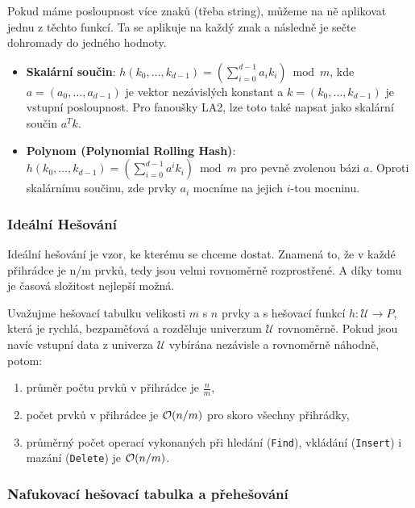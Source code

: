 \bigskip

\noindent Pokud máme posloupnost více znaků (třeba string), můžeme na ně aplikovat jednu z těchto funkcí. Ta se aplikuje na každý znak a následně je sečte dohromady do jedného hodnoty.

\begin{itemize}
    \item \textbf{Skalární součin}: $h(k_0, \dots, k_{d-1}) = \left( \sum_{i=0}^{d-1} a_i k_i \right) \bmod m$, kde $a = (a_0, \dots, a_{d-1})$ je vektor nezávislých konstant a $k =(k_0, \dots, k_{d-1})$ je vstupní posloupnost. Pro fanoušky LA2, lze toto také napsat jako skalární součin $a^Tk$.
    \item \textbf{Polynom (Polynomial Rolling Hash)}: $h(k_0, \dots, k_{d-1}) = \left( \sum_{i=0}^{d-1} a^i k_i \right) \bmod m$ pro pevně zvolenou bázi $a$. Oproti skalárnímu součinu, zde prvky $a_i$ mocníme na jejich $i$-tou mocninu.
\end{itemize}

\bigskip

\subsubsection{Ideální Hešování}

Ideální hešování je vzor, ke kterému se chceme dostat. Znamená to, že v každé přihrádce je n/m prvků, tedy jsou velmi rovnoměrně rozprostřené. A díky tomu je časová složitost nejlepší možná.

\begin{definition}
Uvažujme hešovací tabulku velikosti $m$ s $n$ prvky a s hešovací funkcí $h: \mathcal{U} \to P$, která je rychlá, bezpaměťová a rozděluje univerzum $\mathcal{U}$ rovnoměrně. Pokud jsou navíc vstupní data z univerza $\mathcal{U}$ vybírána nezávisle a rovnoměrně náhodně, potom: \begin{enumerate}[itemsep=-0.2em]
    \item průměr počtu prvků v přihrádce je $\frac{n}{m}$,
    \item počet prvků v přihrádce je $\mathcal{O}(n/m)$ pro skoro všechny přihrádky, 
    \item průměrný počet operací vykonaných při hledání (\texttt{Find}), vkládání (\texttt{Insert}) i mazání (\texttt{Delete}) je $\mathcal{O}(n/m)$. 
    \end{enumerate} 
\end{definition}

\subsubsection{Nafukovací hešovací tabulka a přehešování}

